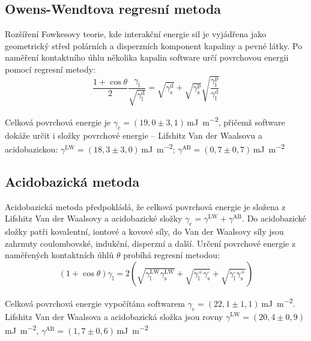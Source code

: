 \documentclass{protokol}
\begin{document}
\subsection{Owens-Wendtova regresní metoda}
Rozšíření Fowkesovy teorie, kde interakční energie sil je vyjádřena jako 
geometrický střed polárních a disperzních komponent kapaliny a pevné látky. Po 
naměření kontaktního úhlu několika kapalin software určí povrchovou energii 
pomocí regresní metody:
\begin{equation}
	\frac{1+\cos\theta}{2}\frac{\gamma_{\text{l}}}{\sqrt{\gamma_{\text{l}}^\text{d}}}
	 = \sqrt{\gamma_{\text{s}}^\text{d}} + \sqrt{\gamma_{\text{s}}^\text{p}} 
	 \sqrt{\frac{\gamma_{\text{l}}^\text{p}}{\gamma_{\text{l}}^\text{d}}}
\end{equation}
\par Celková povrchová energie je $\gamma_{\text{c}} = (19,0 \pm 
3,1)$\,\si{\milli\joule\per\meter\squared}, přičemž software dokáže určit i 
složky povrchové energie -- Lifshitz Van der Waalsovu a acidobazickou: 
$\gamma^\text{LW} = (18,3\pm3,0)$\,\si{\milli\joule\per\meter\squared}; 
$\gamma^\text{AB} = (0,7\pm0,7)$\,\si{\milli\joule\per\meter\squared}


\subsection{Acidobazická metoda}
\par Acidobazická metoda předpokládá, že celková povrchová energie je složena z 
Lifshitz Van der Waalsovy a acidobazické složky $\gamma_{\text{c}} = 
\gamma^\text{LW} + \gamma^\text{AB}$. Do acidobazické složky patři kovalentní, 
iontové a kovové síly, do Van der Waalsovy síly jsou zahrnuty coulombovské, 
indukční, disperzní a další. Určení povrchové energie z naměřených kontaktních 
úhlů $\theta$ probíhá regresní metodou:
\begin{equation}
		\left(1+\cos\theta\right)\gamma_{\text{l}} = 
		2\left(\sqrt{\gamma_\text{l}^{\text{LW}}\gamma_\text{s}^{\text{LW}}} + 
		\sqrt{\gamma_\text{l}^{\text{+}}\gamma_\text{s}^{\text{-}}} + 
		\sqrt{\gamma_\text{l}^{\text{-}}\gamma_\text{s}^{\text{+}}}\right)
\end{equation}
\par Celková povrchová energie vypočítána softwarem $\gamma_{\text{c}} = (22,1 
\pm 
1,1)$\,\si{\milli\joule\per\meter\squared}. Lifshitz Van der Waalsova a 
acidobazická složka jsou rovny $\gamma^\text{LW} = 
(20,4\pm0,9)$\,\si{\milli\joule\per\meter\squared}, 
$\gamma^\text{AB} = (1,7\pm0,6)$\,\si{\milli\joule\per\meter\squared}
\end{document}
